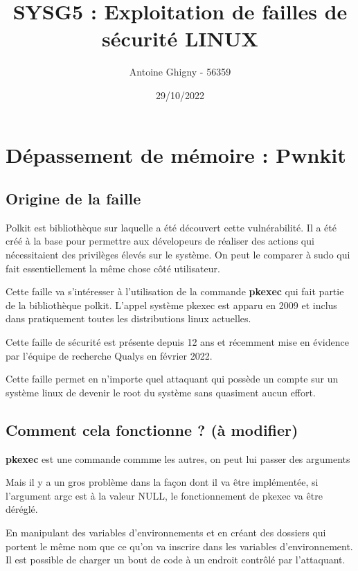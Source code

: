 \documentclass[a4paper, 12pt]{article}
\title{SYSG5 : Exploitation de failles de sécurité LINUX}
\author{Antoine Ghigny - 56359}          \let\Author\@author
\date{29/10/2022}           \let\Date\@date
\begin{document}
\maketitle 

   \tableofcontents

   \section{Dépassement de mémoire : Pwnkit}   		
		\subsection{Origine de la faille}   
   		\begin{flushleft}
			\noindent 	Polkit est bibliothèque sur laquelle a été découvert cette vulnérabilité. Il a été créé à la base pour permettre aux dévelopeurs de réaliser des actions qui nécessitaient des privilèges élevés sur le système. On peut le comparer à sudo qui fait essentiellement la même chose côté utilisateur.
   			\item Cette faille va s'intéresser à l'utilisation de la commande \textbf{pkexec} qui fait partie de la bibliothèque polkit. L'appel système pkexec est apparu en 2009 et inclus dans pratiquement toutes les distributions linux actuelles.
   			\item Cette faille de sécurité est présente depuis 12 ans et récemment mise en évidence par l'équipe de recherche Qualys en février 2022. \cite{qualys}
   			\item Cette faille permet en n’importe quel attaquant qui possède un compte sur un système linux de devenir le root du système sans quasiment aucun effort.
   		\end{flushleft}
   		\subsection{Comment cela fonctionne ? (à modifier) }
   		\begin{flushleft}
   			\noindent \textbf{pkexec} est une commande commme les autres, on peut lui passer des arguments
   			\item Mais il y a un gros problème dans la façon dont il va être implémentée, si l'argument argc est à la valeur NULL, le fonctionnement de pkexec va être déréglé. 
   			\item En manipulant des variables d'environnements et en créant des dossiers qui portent le même nom que ce qu'on va inscrire dans les variables d'environnement. Il est possible de charger un bout de code à un endroit contrôlé par l'attaquant. 
   		\end{flushleft}
   		
\end{document}
